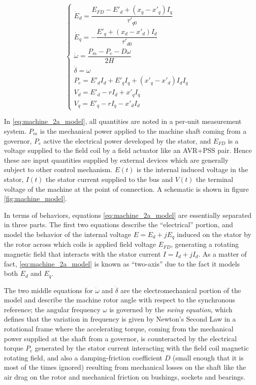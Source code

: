 \begin{equation}
	\left\{\begin{array}{l}
		\dot{E}_d = \dfrac{E_{FD} - E'_d + \left(x_q - x'_q\right)I_q}{\tau'_{q0}} \\[5mm]
		\dot{E}_q = -\dfrac{E'_q + \left(x_d - x'_d\right)I_d}{\tau'_{d0}} \\[5mm]
		\dot{\omega} = \dfrac{P_m - P_e - D\omega}{2H} \\[5mm]
		\dot{\delta} = \omega \\[5mm]
		P_e = E'_dI_d + E'_qI_q + \left(x'_q - x'_d\right)I_dI_q \\[5mm]
		V_d = E'_d - rI_d + x'_qI_q \\[5mm]
		V_q = E'_q - rI_q - x'_dI_d 
	\end{array}\right. \label{eq:machine_2a_model}
\end{equation} %

	In \eqref{eq:machine_2a_model}, all quantities are noted in a per-unit measurement system. $P_m$ is the mechanical power applied to the machine shaft coming from a governor, $P_e$ active the electrical power developed by the stator, and $E_{FD}$ is a voltage supplied to the field coil by a field actuator like an AVR+PSS pair. Hence these are input quantities supplied by external devices which are generally subject to other control mechanism. $E(t)$ is the internal induced voltage in the stator, $I(t)$ the stator current supplied to the bus and $V(t)$ the terminal voltage of the machine at the point of connection. A schematic is shown in figure \ref{fig:machine_model}.

	In terms of behaviors, equations \eqref{eq:machine_2a_model} are essentially separated in three parts. The first two equations describe the ``electrical'' portion, and model the behavior of the internal voltage $E = E_d + jE_q$ induced on the stator by the  rotor across which coils is applied field voltage $E_{FD}$, generating a rotating magnetic field that interacts with the stator current $I = I_d + jI_d$. As a matter of fact, \eqref{eq:machine_2a_model} is known as ``two-axis'' due to the fact it models both $E_d$ and $E_q$.

	 The two middle equations for $\dot{\omega}$ and $\dot{\delta}$ are the electromechanical portion of the model and describe the machine rotor angle with respect to the synchronous reference; the angular frequency $\omega$ is governed by the \textit{swing equation}, which defines that the variation in frequency is given by Newton's Second Law in a rotational frame where the accelerating torque, coming from the mechanical power supplied at the shaft from a governor, is counteracted by the electrical torque $P_e$ generated by the stator current interacting with the field coil magnetic rotating field, and also a damping-friction coefficient $D$ (small enough that it is most of the times ignored) resulting from mechanical losses on the shaft like the air drag on the rotor and mechanical friction on bushings, sockets and bearings.

